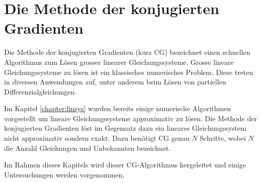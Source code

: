 %
%
%
\chapter{Die Methode der konjugierten Gradienten\label{chapter:cg}}
\begin{refsection}
%
%

{\parindent0pt
Die} Methode der konjugierten Gradienten (kurz CG) bezeichnet einen schnellen Algorithmus zum Lösen grosser linearer Gleichungssysteme.
Grosse lineare Gleichungssysteme zu lösen ist ein klassisches numerisches Problem.
Diese treten in diversen Anwendungen auf, unter anderem beim Lösen von partiellen Differenzialgleichungen.

Im Kapitel \ref{chapter:linsys} wurden bereits einige numerische Algorithmen vorgestellt um lineare Gleichungssysteme approximativ zu lösen.
Die Methode der konjugierten Gradienten löst im Gegensatz dazu ein lineares Gleichungssystem nicht approximativ sondern exakt.
Dazu benötigt CG genau $N$ Schritte, wobei $N$ die Anzahl Gleichungen und Unbekannten bezeichnet.

Im Rahmen dieses Kapitels wird dieser CG-Algorithmus hergeleitet und einige Untersuchungen werden vorgenommen.







\printbibliography[heading=subbibliography]
\end{refsection}

